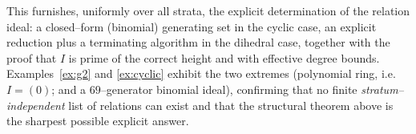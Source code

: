 \documentclass{amsart}
\theoremstyle{definition}
\begin{document}
This furnishes, uniformly over all strata, the explicit determination of the
relation ideal: a closed--form (binomial) generating set in the cyclic case, an
explicit reduction plus a terminating algorithm in the dihedral case, together with
the proof that $I$ is prime of the correct height and with effective degree bounds.
Examples~\ref{ex:g2} and \ref{ex:cyclic} exhibit the two extremes (polynomial ring,
i.e.\ $I=(0)$; and a $69$--generator binomial ideal), confirming that no finite
\emph{stratum--independent} list of relations can exist and that the structural
theorem above is the sharpest possible explicit answer.
\end{document}
